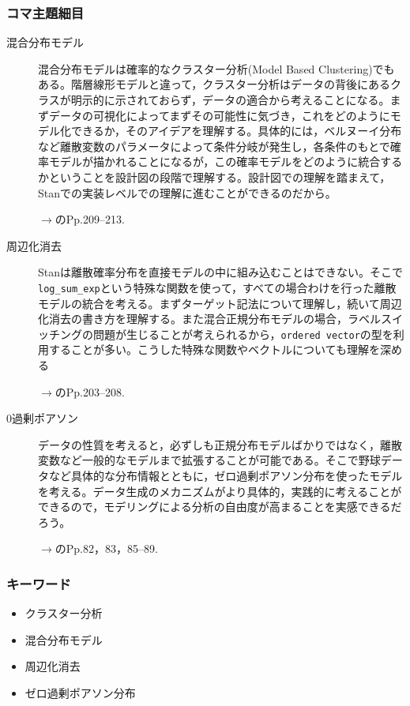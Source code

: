 \subsubsection{コマ主題細目}
\begin{description}
	\item[混合分布モデル] 混合分布モデルは確率的なクラスター分析(Model Based Clustering)でもある。階層線形モデルと違って，クラスター分析はデータの背後にあるクラスが明示的に示されておらず，データの適合から考えることになる。まずデータの可視化によってまずその可能性に気づき，これをどのようにモデル化できるか，そのアイデアを理解する。具体的には，ベルヌーイ分布など離散変数のパラメータによって条件分岐が発生し，各条件のもとで確率モデルが描かれることになるが，この確率モデルをどのように統合するかということを設計図の段階で理解する。設計図での理解を踏まえて，Stanでの実装レベルでの理解に進むことができるのだから。
	      \begin{flushright}
		      $\to$\textcite{Matsuura201610}のPp.209--213.
	      \end{flushright}

	\item[周辺化消去] Stanは離散確率分布を直接モデルの中に組み込むことはできない。そこで\verb|log_sum_exp|という特殊な関数を使って，すべての場合わけを行った離散モデルの統合を考える。まずターゲット記法について理解し，続いて周辺化消去の書き方を理解する。また混合正規分布モデルの場合，ラベルスイッチングの問題が生じることが考えられるから，\verb|ordered vector|の型を利用することが多い。こうした特殊な関数やベクトルについても理解を深める
	      \begin{flushright}
		      $\to$\textcite{Matsuura201610}のPp.203--208.
	      \end{flushright}
	\item[0過剰ポアソン] データの性質を考えると，必ずしも正規分布モデルばかりではなく，離散変数など一般的なモデルまで拡張することが可能である。そこで野球データなど具体的な分布情報とともに，ゼロ過剰ポアソン分布を使ったモデルを考える。データ生成のメカニズムがより具体的，実践的に考えることができるので，モデリングによる分析の自由度が高まることを実感できるだろう。
	      \begin{flushright}
		      $\to$\textcite{Matsuura201610}のPp.82，83，85--89.
	      \end{flushright}
\end{description}
\subsubsection{キーワード}
\begin{itemize}
	\item クラスター分析
	\item 混合分布モデル
	\item 周辺化消去
	\item ゼロ過剰ポアソン分布
\end{itemize}
